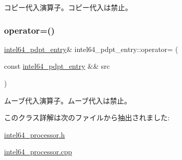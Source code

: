 コピー代入演算子。コピー代入は禁止。 \hypertarget{classintel64__pdpt__entry_a7a41c3ce7324028364eca0871db3d505}{}\label{classintel64__pdpt__entry_a7a41c3ce7324028364eca0871db3d505} 
\subsubsection{\texorpdfstring{operator=()}{operator=()}\hspace{0.1cm}{\footnotesize\ttfamily [2/2]}}
{\footnotesize\ttfamily \hyperlink{classintel64__pdpt__entry}{intel64\+\_\+pdpt\+\_\+entry}\& intel64\+\_\+pdpt\+\_\+entry\+::operator= (\begin{DoxyParamCaption}\item[{const \hyperlink{classintel64__pdpt__entry}{intel64\+\_\+pdpt\+\_\+entry} \&\&}]{src }\end{DoxyParamCaption})\hspace{0.3cm}{\ttfamily [delete]}}

ムーブ代入演算子。ムーブ代入は禁止。 

このクラス詳解は次のファイルから抽出されました\+:\begin{DoxyCompactItemize}
\item 
\hyperlink{intel64__processor_8h}{intel64\+\_\+processor.\+h}\item 
\hyperlink{intel64__processor_8cpp}{intel64\+\_\+processor.\+cpp}\end{DoxyCompactItemize}
